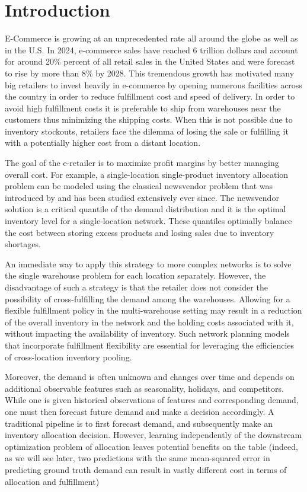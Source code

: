 \documentclass[poms,final,blindrev]{poms1_V1} %
\begin{document}
\section{Introduction}\label{sec1}
E-Commerce is growing at an unprecedented rate all around the globe as well as in the U.S. In 2024, e-commerce sales have reached 6 trillion dollars and account for around 20\% percent of all retail sales in the United States and were forecast to rise by more than 8\% by 2028.
This tremendous growth has motivated many big retailers to invest heavily in e-commerce by opening numerous facilities across the country in order to reduce fulfillment cost and speed of delivery.  In order to avoid high fulfillment costs it is preferable to ship from warehouses near the customers thus minimizing the shipping costs. When this is not possible due to inventory stockouts, retailers face the dilemma of losing the sale or fulfilling it with a potentially higher cost from a distant location. 

The goal of the e-retailer is to maximize profit margins by better managing overall cost.  For example, a single-location single-product inventory allocation problem can be modeled using the classical newsvendor problem that was introduced by \cite{arrow1951optimal} and has been studied extensively ever since. The newsvendor solution is a critical quantile of the demand distribution and it is the optimal inventory level for a single-location network. These quantiles optimally balance the cost between storing excess products and losing sales due to inventory shortages. 

An immediate way to apply this strategy to more complex networks is to solve the single warehouse problem for each location separately. However, the disadvantage of such a strategy is that the retailer does not consider the possibility of cross-fulfilling the demand among the warehouses. Allowing for a flexible fulfillment policy in the multi-warehouse setting may result in a reduction of the overall inventory in the network and the holding costs associated with it, without impacting the availability of inventory. Such network planning models that incorporate fulfillment flexibility are essential for leveraging the efficiencies of cross-location inventory pooling. 

Moreover, the demand is often unknown and changes over time and depends on additional observable features such as seasonality, holidays, and competitors. While one is given historical observations of features and corresponding demand, one must then forecast future demand and make a decision accordingly. A traditional pipeline is to first forecast demand, and subsequently make an inventory allocation decision. However, learning independently of the downstream optimization problem of allocation leaves potential benefits on the table (indeed, as we will see later, two predictions with the same mean-squared error in predicting ground truth demand can result in vastly different cost in terms of allocation and fulfillment)
\end{document}
